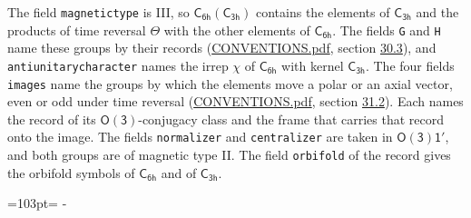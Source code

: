 \documentclass[10pt,a4paper]{article}
\newcommand{\needspace}[1]{\par\penalty-100\begingroup\dimen0=#1\relax\dimen2=\pagegoal
  \advance\dimen2-\pagetotal\ifdim\dimen0>\dimen2\relax\ifdim\dimen2>0pt\vfil\break\fi\fi
  \endgroup}
\numberwithin{equation}{section}
\newcommand{\grp}[1]{\mathsf{#1}}
\begin{document}
The field \texttt{magnetictype} is III, so $\grp{C_{6h}}(\grp{C_{3h}})$ contains the elements of $\grp{C_{3h}}$ and the products of time reversal $\varTheta$ with the other elements of $\grp{C_{6h}}$. The fields \texttt{G} and \texttt{H} name these groups by their records (\href{../../CONVENTIONS.pdf}{CONVENTIONS.pdf}, section \href{../../CONVENTIONS.pdf\#conv.30.3}{30.3}), and \texttt{antiunitarycharacter} names the irrep $\chi$ of $\grp{C_{6h}}$ with kernel $\grp{C_{3h}}$. The four fields \texttt{images} name the groups by which the elements move a polar or an axial vector, even or odd under time reversal (\href{../../CONVENTIONS.pdf}{CONVENTIONS.pdf}, section \href{../../CONVENTIONS.pdf\#conv.31.2}{31.2}). Each names the record of its $\grp{O(3)}$-conjugacy class and the frame that carries that record onto the image. The fields \texttt{normalizer} and \texttt{centralizer} are taken in $\grp{O(3)1'}$, and both groups are of magnetic type II. The field \texttt{orbifold} of the record gives the orbifold symbols of $\grp{C_{6h}}$ and of $\grp{C_{3h}}$.
\needspace{103pt}
\end{document}
